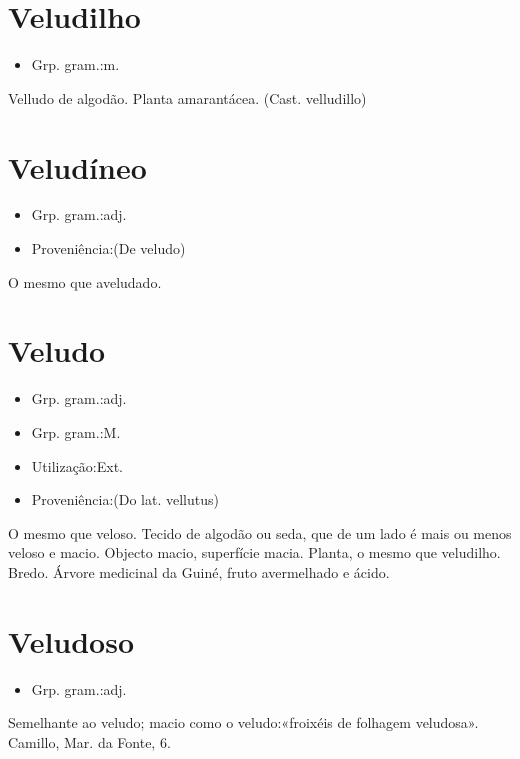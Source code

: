 \documentclass{article}
\begin{document}
\section{Veludilho}
\begin{itemize}
\item {Grp. gram.:m.}
\end{itemize}
Velludo de algodão.
Planta amarantácea.
(Cast. \textunderscore velludillo\textunderscore )
\section{Veludíneo}
\begin{itemize}
\item {Grp. gram.:adj.}
\end{itemize}
\begin{itemize}
\item {Proveniência:(De \textunderscore veludo\textunderscore )}
\end{itemize}
O mesmo que \textunderscore aveludado\textunderscore .
\section{Veludo}
\begin{itemize}
\item {Grp. gram.:adj.}
\end{itemize}
\begin{itemize}
\item {Grp. gram.:M.}
\end{itemize}
\begin{itemize}
\item {Utilização:Ext.}
\end{itemize}
\begin{itemize}
\item {Proveniência:(Do lat. \textunderscore vellutus\textunderscore )}
\end{itemize}
O mesmo que \textunderscore veloso\textunderscore .
Tecido de algodão ou seda, que de um lado é mais ou menos veloso e macio.
Objecto macio, superfície macia.
Planta, o mesmo que \textunderscore veludilho\textunderscore .
Bredo.
Árvore medicinal da Guiné, fruto avermelhado e ácido.
\section{Veludoso}
\begin{itemize}
\item {Grp. gram.:adj.}
\end{itemize}
Semelhante ao veludo; macio como o veludo:«\textunderscore froixéis de folhagem veludosa\textunderscore ». Camillo, \textunderscore Mar. da Fonte\textunderscore , 6.
\end{document}
